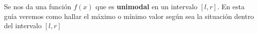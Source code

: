 Se nos da una función $f(x)$ que es \textbf{unimodal} en un intervalo $[l,r]$. En esta guía veremos como hallar el máximo o mínimo valor según sea la situación dentro del intervalo $[l,r]$